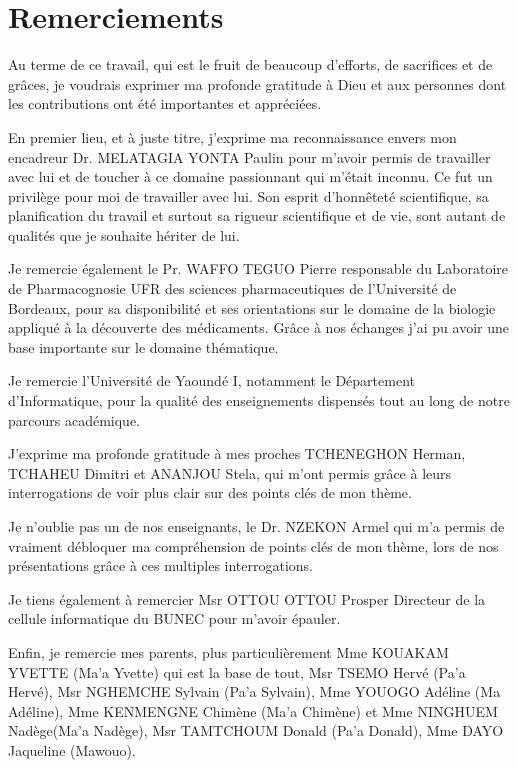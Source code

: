 \chapter*{Remerciements}
\vspace{-0.75cm}

Au terme de ce travail, qui est le fruit de beaucoup d’efforts, de sacrifices et de grâces,
je voudrais exprimer ma profonde gratitude à Dieu et aux personnes dont les contributions ont été importantes et appréciées.

En premier lieu, et à juste titre, j’exprime ma reconnaissance envers mon encadreur Dr. MELATAGIA YONTA Paulin pour m’avoir permis de travailler avec lui et de toucher à ce domaine passionnant qui m’était inconnu.
Ce fut un privilège pour moi de travailler avec lui. Son esprit d’honnêteté scientifique, sa planification du travail et surtout sa rigueur scientifique et de vie, sont autant de qualités que je souhaite hériter de lui.

Je remercie également le Pr. WAFFO TEGUO Pierre responsable du Laboratoire de Pharmacognosie UFR des sciences pharmaceutiques de l'Université de Bordeaux, pour sa disponibilité et ses orientations sur le domaine de la biologie appliqué à la découverte des médicaments. Grâce à nos échanges j'ai pu avoir une base importante sur le domaine thématique.

Je remercie l’Université de Yaoundé I, notamment le Département d’Informatique, pour la
qualité des enseignements dispensés tout au long de notre parcours académique.

J’exprime ma profonde gratitude à mes proches TCHENEGHON Herman, TCHAHEU Dimitri et ANANJOU Stela, qui m'ont permis grâce à leurs interrogations de voir plus clair sur des points clés de mon thème.

Je n'oublie pas un de nos enseignants, le Dr. NZEKON Armel qui m'a permis de vraiment débloquer ma compréhension de points clés de mon thème, lors de nos présentations grâce à ces multiples interrogations.

Je tiens également à remercier Msr OTTOU OTTOU Prosper Directeur de la cellule informatique du BUNEC pour m'avoir épauler.

Enfin, je remercie mes parents, plus particulièrement Mme KOUAKAM YVETTE (Ma'a Yvette) qui est la base de tout, Msr TSEMO Hervé (Pa'a Hervé), Msr NGHEMCHE Sylvain (Pa'a Sylvain), Mme YOUOGO Adéline (Ma Adéline), Mme KENMENGNE Chimène (Ma'a Chimène) et Mme NINGHUEM Nadège(Ma'a Nadège), Msr TAMTCHOUM Donald (Pa'a Donald), Mme DAYO Jaqueline (Mawouo).


